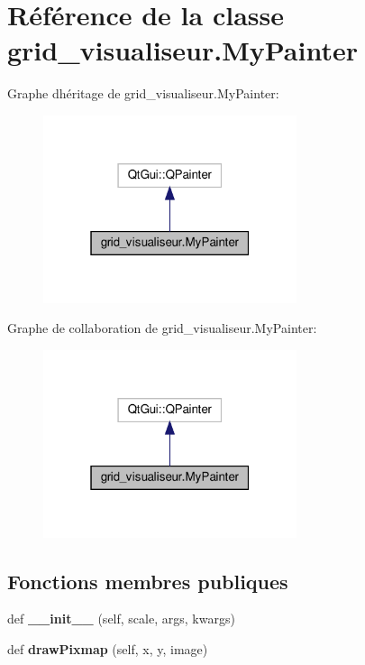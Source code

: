\hypertarget{classgrid__visualiseur_1_1MyPainter}{}\section{Référence de la classe grid\+\_\+visualiseur.\+My\+Painter}
\label{classgrid__visualiseur_1_1MyPainter}


Graphe d\textquotesingle{}héritage de grid\+\_\+visualiseur.\+My\+Painter\+:\nopagebreak
\begin{figure}[H]
\begin{center}
\leavevmode
\includegraphics[width=211pt]{classgrid__visualiseur_1_1MyPainter__inherit__graph}
\end{center}
\end{figure}


Graphe de collaboration de grid\+\_\+visualiseur.\+My\+Painter\+:\nopagebreak
\begin{figure}[H]
\begin{center}
\leavevmode
\includegraphics[width=211pt]{classgrid__visualiseur_1_1MyPainter__coll__graph}
\end{center}
\end{figure}
\subsection*{Fonctions membres publiques}
\begin{DoxyCompactItemize}
\item 
\mbox{\label{classgrid__visualiseur_1_1MyPainter_ab6f7820d87cbc1b481f2055e44559cf1}} 
def {\bfseries \+\_\+\+\_\+init\+\_\+\+\_\+} (self, scale, args, kwargs)
\item 
\mbox{\label{classgrid__visualiseur_1_1MyPainter_a0a9785ebee0d148222e2895303b053b1}} 
def {\bfseries draw\+Pixmap} (self, x, y, image)
\end{DoxyCompactItemize}
